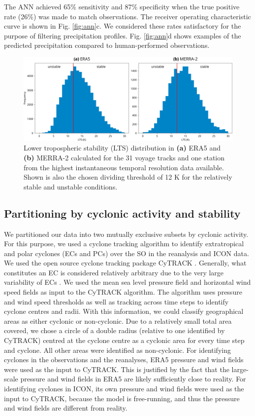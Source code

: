 \documentclass[12pt,a4paper]{article}
\begin{document}
The ANN achieved 65\% sensitivity and 87\% specificity when the true positive
rate (26\%) was made to match observations. The receiver operating
characteristic curve is shown in Fig. \ref{fig:ann}c. We considered these rates
satisfactory for the purpose of filtering precipitation profiles. Fig.
\ref{fig:ann}d shows examples of the predicted precipitation compared to
human-performed observations.

\begin{figure}[b!]
\centering
\includegraphics[width=\textwidth]{img/lts_dist.pdf}
\caption{
Lower tropospheric stability (LTS) distribution in \textbf{(a)} ERA5 and
\textbf{(b)} MERRA-2 calculated for the 31 voyage tracks and one station from
the highest instantaneous temporal resolution data available. Shown is also the
chosen dividing threshold of 12 K for the relatively stable and unstable
conditions.
}
\label{fig:lts}
\end{figure}

\subsection{Partitioning by cyclonic activity and stability}
\label{sec:cyclone-stability}

We partitioned our data into two mutually exclusive subsets by cyclonic
activity. For this purpose, we used a cyclone tracking algorithm to identify
extratropical and polar cyclones (ECs and PCs) over the SO in the reanalysis
and ICON data. We used the open source cyclone tracking package CyTRACK
\citep{perez-alarcon2024}.  Generally, what constitutes an EC is considered
relatively arbitrary due to the very large variability of ECs \citep{neu2013}.
We used the mean sea level pressure field and horizontal wind speed fields as
input to the CyTRACK algorithm. The algorithm uses pressure and wind speed
thresholds as well as tracking across time steps to identify cyclone centres
and radii. With this information, we could classify geographical areas as
either cyclonic or non-cyclonic. Due to a relatively small total area covered,
we chose a circle of a double radius (relative to one identified by CyTRACK)
centred at the cyclone centre as a cyclonic area for every time step and
cyclone. All other areas were identified as non-cyclonic. For identifying
cyclones in the observations and the reanalyses, ERA5 pressure and wind fields
were used as the input to CyTRACK.  This is justified by the fact that the
large-scale pressure and wind fields in ERA5 are likely sufficiently close to
reality. For identifying cyclones in ICON, its own pressure and wind fields
were used as the input to CyTRACK, because the model is free-running, and thus
the pressure and wind fields are different from reality.
\end{document}
